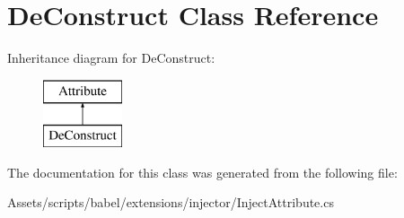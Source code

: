 \hypertarget{class_de_construct}{\section{De\-Construct Class Reference}
\label{class_de_construct}
}
Inheritance diagram for De\-Construct\-:\begin{figure}[H]
\begin{center}
\leavevmode
\includegraphics[height=2.000000cm]{class_de_construct}
\end{center}
\end{figure}


The documentation for this class was generated from the following file\-:\begin{DoxyCompactItemize}
\item 
Assets/scripts/babel/extensions/injector/Inject\-Attribute.\-cs\end{DoxyCompactItemize}

